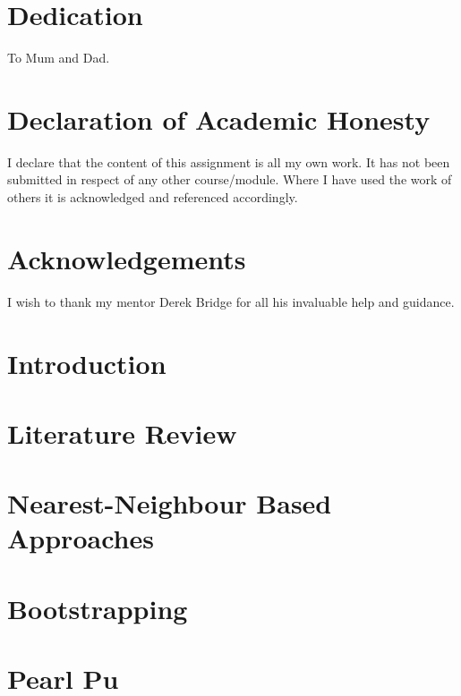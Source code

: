 \documentclass[12pt, twoside]{report}
\begin{document}
    
    
    
    
    \chapter*{Dedication}
    To Mum and Dad.
    
    \chapter*{Declaration of Academic Honesty}
    I declare that the content of this assignment is all my own work. It has not been submitted in respect of any other course/module. Where I have used the work of others it is acknowledged and referenced accordingly.
    
    \chapter*{Acknowledgements}
    I wish to thank my mentor Derek Bridge for all his invaluable help and guidance.
    
    \tableofcontents
    \listoffigures
    \listoftables
    
    \chapter{Introduction}
    
    
    \chapter{Literature Review}
    
    
    \chapter{Nearest-Neighbour Based Approaches}
    
    
    \chapter{Bootstrapping}
    
    
    \chapter{Pearl Pu}
    
    
\end{document}
